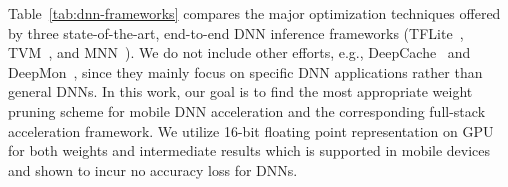 \documentclass[sigplan,screen]{acmart}
\begin{document}
Table~\ref{tab:dnn-frameworks} compares the major optimization techniques offered by three state-of-the-art, end-to-end DNN inference frameworks (TFLite~\cite{TensorFlow-Lite}, TVM~\cite{chen2018tvm}, and MNN~\cite{Ali-MNN}).
We do not include other efforts, e.g., DeepCache~\cite{xu2018deepcache} and DeepMon~\cite{huynh2017deepmon}, since they mainly focus on specific DNN applications rather than general DNNs.
In this work, our goal is to find
the most appropriate weight pruning scheme for mobile DNN acceleration and the corresponding full-stack acceleration framework. We utilize 16-bit floating point representation on GPU for both weights and intermediate results which is supported in mobile devices and shown to incur no accuracy loss \cite{TensorFlow-Lite,Ali-MNN,chen2018tvm} for DNNs.
\end{document}
